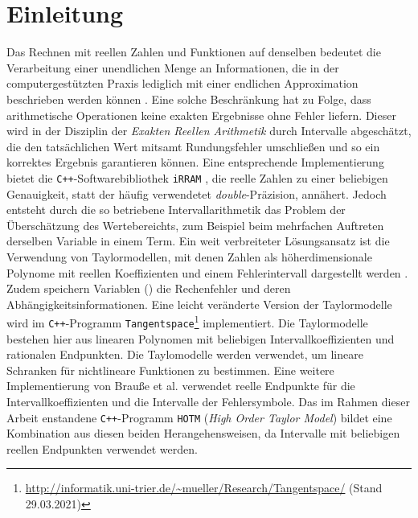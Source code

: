 
\chapter{Einleitung}
\label{ch:Einleitung}

Das Rechnen mit reellen Zahlen und Funktionen auf denselben bedeutet die Verarbeitung einer unendlichen Menge an Informationen, die in der computergestützten Praxis lediglich mit einer endlichen Approximation beschrieben werden können \cite{Brattka2008}. Eine solche Beschränkung hat zu Folge, dass arithmetische Operationen keine exakten Ergebnisse ohne Fehler liefern. Dieser wird in der Disziplin der \textit{Exakten Reellen Arithmetik} durch Intervalle abgeschätzt, die den tatsächlichen Wert mitsamt Rundungsfehler umschließen und so ein korrektes Ergebnis garantieren können. Eine entsprechende Implementierung bietet die \verb.C++.-Softwarebibliothek \verb+iRRAM+ \cite{Mller2009EnhancingIE}, die reelle Zahlen zu einer beliebigen Genauigkeit, statt der häufig verwendetet \textit{double}-Präzision, annähert.
Jedoch entsteht durch die so betriebene Intervallarithmetik das Problem der Überschätzung des Wertebereichts, zum Beispiel beim mehrfachen Auftreten derselben Variable in einem Term. Ein weit verbreiteter Lösungsansatz ist die Verwendung von Taylormodellen, mit denen Zahlen als höherdimensionale Polynome mit reellen Koeffizienten und einem Fehlerintervall dargestellt werden \cite{DBLP:conf/macis/BrausseKM15} \cite{makino2001}. Zudem speichern Variablen () die Rechenfehler und deren Abhängigkeitsinformationen. Eine leicht veränderte Version der Taylormodelle wird im \verb.C++.-Programm \verb+Tangentspace+\footnote{\url{http://informatik.uni-trier.de/~mueller/Research/Tangentspace/} (Stand 29.03.2021)} implementiert. Die Taylormodelle bestehen hier aus linearen Polynomen mit beliebigen Intervallkoeffizienten und rationalen Endpunkten. Die Taylomodelle werden verwendet, um lineare Schranken für nichtlineare Funktionen zu bestimmen. Eine weitere Implementierung von Brauße et al. \cite{DBLP:conf/macis/BrausseKM15} verwendet reelle Endpunkte für die Intervallkoeffizienten und die Intervalle der Fehlersymbole. Das im Rahmen dieser Arbeit enstandene \verb.C++.-Programm \verb+HOTM+ (\textit{High Order Taylor Model}) bildet eine Kombination aus diesen beiden Herangehensweisen, da Intervalle mit beliebigen reellen Endpunkten verwendet werden. 

